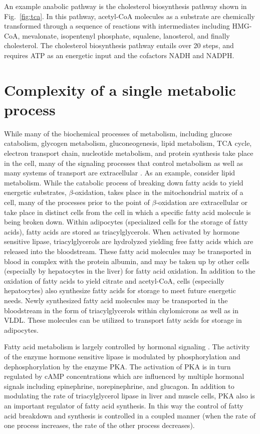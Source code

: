 \begin{DoubleSpace*}
An example anabolic pathway is the cholesterol biosynthesis pathway shown in Fig.~\ref{fig:tca}. In this pathway, acetyl-CoA molecules as a substrate are chemically transformed through a sequence of reactions with intermediates including HMG-CoA, mevalonate, isopentenyl phosphate, squalene, lanosterol, and finally cholesterol. The cholesterol biosynthesis pathway entails over 20 steps, and requires ATP as an energetic input and the cofactors NADH and NADPH. 

\section{Complexity of a single metabolic process}
While many of the biochemical processes of metabolism, including glucose catabolism, glycogen metabolism, gluconeogenesis, lipid metabolism, TCA cycle, electron transport chain, nucleotide metabolism, and protein synthesis  take place in the cell, many of the signaling processes that control metabolism as well as many systems of transport are extracellular \cite{voet2013}. As an example, consider lipid metabolism. While the catabolic process of breaking down fatty acids to yield energetic substrates, $\beta$-oxidation, takes place in the mitochondrial matrix of a cell, many of the processes prior to the point of $\beta$-oxidation are extracellular or take place in distinct cells from the cell in which a specific fatty acid molecule is being broken down. Within adipocytes (specialized cells for the storage of fatty acids), fatty acids are stored as triacylglycerols. When activated by hormone sensitive lipase, triacylglycerols are hydrolyzed yielding free fatty acids which are released into the bloodstream. These fatty acid molecules may be transported in blood in complex with the protein albumin, and may be taken up by other cells (especially by hepatocytes in the liver) for fatty acid oxidation. In addition to the oxidation of fatty acids to yield citrate and acetyl-CoA, cells (especially hepatocytes) also synthesize fatty acids for storage to meet future energetic needs. Newly synthesized fatty acid molecules may be transported in the bloodstream in the form of triacylglycerols within chylomicrons as well as in VLDL. These molecules can be utilized to transport fatty acids for storage in adipocytes. 

Fatty acid metabolism is largely controlled by hormonal signaling \cite{voet2013}. The activity of the enzyme hormone sensitive lipase is modulated by phosphorylation and dephosphorylation by the enzyme PKA. The activation of PKA is in turn regulated by cAMP concentrations which are influenced by multiple hormonal signals including epinephrine, norepinephrine, and glucagon. In addition to modulating the rate of triacylglycerol lipase in liver and muscle cells, PKA also is an important regulator of fatty acid synthesis. In this way the control of fatty acid breakdown and synthesis is controlled in a coupled manner (when the rate of one process increases, the rate of the other process decreases).


\end{DoubleSpace*}
